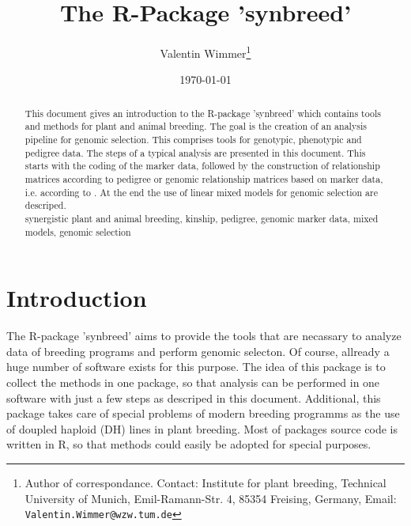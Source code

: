 \documentclass[a4paper,11pt]{article}
\title{The R-Package 'synbreed'}
\author{
Valentin Wimmer\thanks{Author of correspondance. Contact: Institute for plant breeding, Technical University of Munich, Emil-Ramann-Str. 4,
	85354 Freising, Germany, Email: \texttt{Valentin.Wimmer@wzw.tum.de}}\\
} \date{\today}
\begin{document}






\maketitle


\begin{abstract}
  \noindent This document gives an introduction to the R-package
  'synbreed' which contains tools and methods for plant and animal breeding. The goal is the creation of an analysis pipeline for genomic selection. This comprises tools
  for genotypic, phenotypic and pedigree data. The steps of a typical analysis are presented in this document. This starts with the coding of the marker data, followed by the construction of relationship matrices according
  to pedigree or genomic relationship matrices based on marker data, i.e. according to \citet{vanRaden2008}. At the end the use of linear mixed models for genomic selection are descriped. \\

   synergistic plant and animal breeding, kinship, pedigree, genomic marker data, mixed models, genomic selection
  

  
\end{abstract}


\section{Introduction}\label{sec:Introduction}

The R-package 'synbreed' aims to provide the tools that are necassary to analyze data of breeding programs and perform genomic selecton. Of course, allready
a huge number of software exists for this purpose. The idea of this package is to collect the methods in one package, so that analysis can be performed in one software with just a few steps as descriped in this document. 
Additional, this package takes care of special problems of modern breeding programms as the use of doupled haploid (DH) lines in plant breeding.  Most of packages source code is written in R, so that methods could 
easily be adopted for special purposes.
\end{document}
